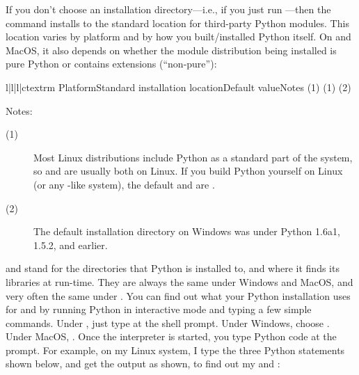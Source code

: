 \documentclass{howto}
\begin{document}
If you don't choose an installation directory---i.e., if you just run
---then the  command installs to
the standard location for third-party Python modules.  This location
varies by platform and by how you built/installed Python itself.  On
\UNIX{} and MacOS, it also depends on whether the module distribution
being installed is pure Python or contains extensions (``non-pure''):
\begin{tableiv}{l|l|l|c}{textrm}%
  {Platform}{Standard installation location}{Default value}{Notes}
          {}
          {}
          {(1)}
          {}
          {}
          {(1)}
          {}
          {}
          {(2)}
          {}
          {}
          {}
          {}
          {}
          {}
\end{tableiv}

\noindent Notes:
\begin{description}
\item[(1)] Most Linux distributions include Python as a standard part of
  the system, so  and  are usually
  both  on Linux.  If you build Python yourself on Linux (or
  any \UNIX-like system), the default  and
   are .
\item[(2)] The default installation directory on Windows was
   under
  Python 1.6a1, 1.5.2, and earlier.
\end{description}

 and  stand for the directories
that Python is installed to, and where it finds its libraries at
run-time.  They are always the same under Windows and MacOS, and very
often the same under \UNIX.  You can find out what your Python
installation uses for  and  by
running Python in interactive mode and typing a few simple commands.
Under \UNIX, just type  at the shell prompt.  Under
Windows, choose .  Under MacOS, .
Once the interpreter is started, you type Python code at the
prompt.  For example, on my Linux system, I type the three Python
statements shown below, and get the output as shown, to find out my
 and :
\end{document}
